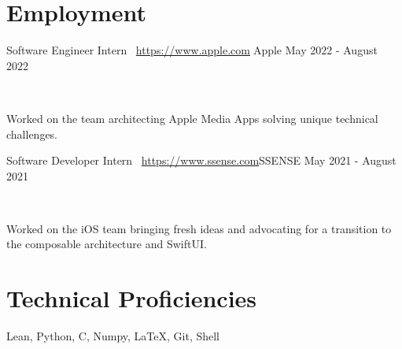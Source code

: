 \documentclass[]{style}
\begin{document}
\section{Employment}

\begin{entrylist}

\vspace{1mm}

\entry
{Software Engineer Intern \ {\normalfont \url{https://www.apple.com}{Apple}}}
{May 2022 - August 2022}
{ ~ \vspace{-2.5mm}

Worked on the team architecting Apple Media Apps solving unique technical challenges. }

\entry
{Software Developer Intern \ {\normalfont \url{https://www.ssense.com}{SSENSE}}}
{May 2021 - August 2021}
{ ~ \vspace{-2.5mm}

Worked on the iOS team bringing fresh ideas and advocating for a transition to the composable architecture and SwiftUI.}

\end{entrylist}

\section{Technical Proficiencies}

Lean, Python, C, Numpy, \LaTeX, Git, Shell
\end{document}
